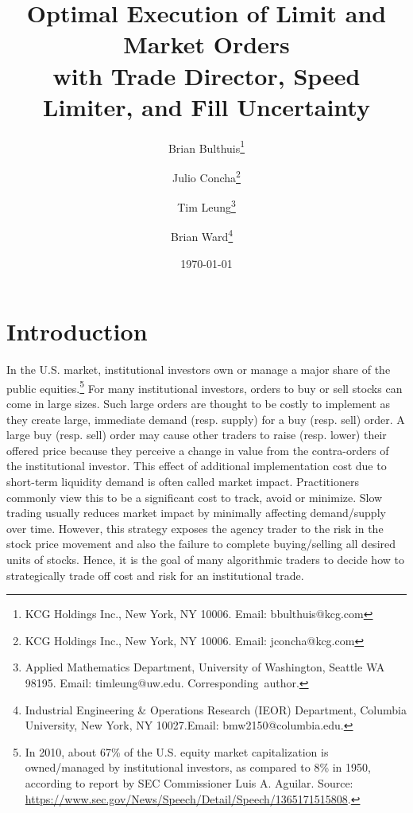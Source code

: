 \documentclass[12pt, letterpaper]{article}
\title{Optimal Execution of Limit and  Market Orders\\ with Trade Director, Speed Limiter, and Fill Uncertainty  }
\author{Brian Bulthuis\thanks{KCG Holdings Inc., New York, NY 10006. Email: bbulthuis@kcg.com} \and Julio Concha\thanks{KCG Holdings Inc., New York, NY 10006. Email: jconcha@kcg.com} \and Tim Leung\thanks{Applied Mathematics Department, University of Washington, Seattle WA 98195. Email: {timleung@uw.edu}. \mbox{Corresponding author}. } \and Brian Ward\thanks{Industrial Engineering \& Operations Research (IEOR) Department, Columbia University, New York, NY 10027.Email: {bmw2150@columbia.edu}.} \ }
\date{\today}
\numberwithin{equation}{section}
\numberwithin{theorem}{section}
\begin{document}
\maketitle




\newpage
\section{Introduction}
In the U.S. market, institutional investors own or manage a major share of the public equities.\footnote{In 2010, about 67\% of the U.S. equity market capitalization is owned/managed by institutional investors, as compared to 8\% in 1950, according to report by SEC Commissioner Luis A. Aguilar. Source: \url{https://www.sec.gov/News/Speech/Detail/Speech/1365171515808}.}  For many institutional investors, orders to buy or sell stocks can come in large sizes.  Such large orders are thought to be costly to implement as they create large, immediate demand (resp. supply) for a buy (resp. sell) order. A large buy (resp. sell) order may cause other traders to raise (resp. lower) their offered price because they perceive a change in value from the contra-orders of the institutional investor. This effect of additional implementation cost due to short-term liquidity demand is often called market impact.  Practitioners commonly view this to be a significant cost to track, avoid or minimize. Slow trading usually reduces  market impact by minimally affecting demand/supply over time. However, this strategy exposes the agency trader to the risk in the stock price movement and also the failure to complete buying/selling all desired units of stocks. Hence, it is the goal of many algorithmic traders to decide how to strategically trade off cost and risk for an institutional trade.
\end{document}
